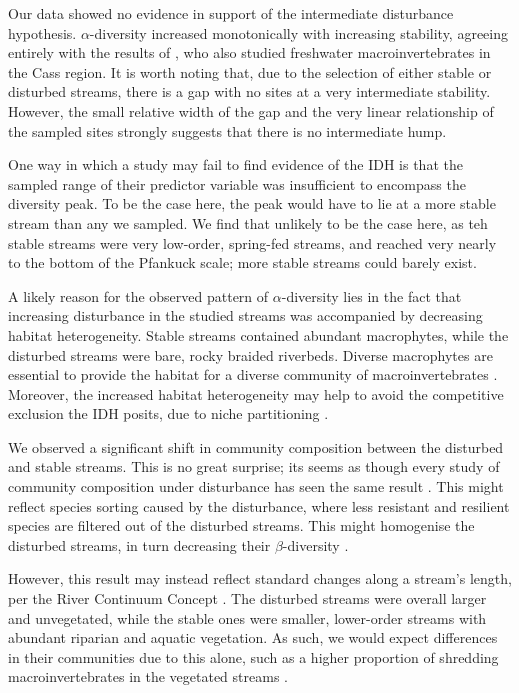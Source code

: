 \documentclass[a4paper,10pt]{article}
\begin{document}
Our data showed no evidence in support of the intermediate disturbance hypothesis.
$\alpha$-diversity increased monotonically with increasing stability, agreeing entirely with the results of \textcite{diversity-stability-canterbury}, who also studied freshwater macroinvertebrates in the Cass region.
It is worth noting that, due to the selection of either stable or disturbed streams, there is a gap with no sites at a very intermediate stability.
However, the small relative width of the gap and the very linear relationship of the sampled sites strongly suggests that there is no intermediate hump.

One way in which a study may fail to find evidence of the IDH is that the sampled range of their predictor variable was insufficient to encompass the diversity peak.
To be the case here, the peak would have to lie at a more stable stream than any we sampled.
We find that unlikely to be the case here, as teh stable streams were very low-order, spring-fed streams, and reached very nearly to the bottom of the Pfankuck scale; more stable streams could barely exist.

A likely reason for the observed pattern of $\alpha$-diversity lies in the fact that increasing disturbance in the studied streams was accompanied by decreasing habitat heterogeneity.
Stable streams contained abundant macrophytes, while the disturbed streams were bare, rocky braided riverbeds.
Diverse macrophytes are essential to provide the habitat for a diverse community of macroinvertebrates \parencite{macrophyte-associations}.
Moreover, the increased habitat heterogeneity may help to avoid the competitive exclusion the IDH posits, due to niche partitioning \parencite{heterogeneity-competition,idh-patch-dynamics}. %

We observed a significant shift in community composition between the disturbed and stable streams.
This is no great surprise; its seems as though every study of community composition under disturbance has seen the same result \parencite{disturbance-composition-invasion, disturbance-composition-simulate, disturbance-compostion-desert, meta-richness-disturbance}.
This might reflect species sorting caused by the disturbance, where less resistant and resilient species are filtered out of the disturbed streams.
This might homogenise the disturbed streams, in turn decreasing their $\beta$-diversity \parencite{disturbance-beta-meta}.

However, this result may instead reflect standard changes along a stream's length, per the River Continuum Concept \parencite{rcc}.
The disturbed streams were overall larger and unvegetated, while the stable ones were smaller, lower-order streams with abundant riparian and aquatic vegetation.
As such, we would expect differences in their communities due to this alone, such as a higher proportion of shredding macroinvertebrates in the vegetated streams \parencite{rcc}.
\end{document}
